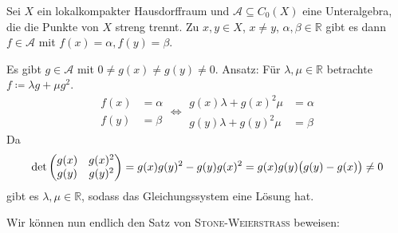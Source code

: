 \begin{lemma}[{name=[Eigenschaft einer streng trennenden Unteralgebra]},label=lem:unteralg-streng-trennend]
	Sei $X$ ein lokalkompakter Hausdorffraum und $\mathcal{A} \subseteq C_0(X)$ eine Unteralgebra, die die Punkte von $X$ streng trennt. 
	Zu $x,y \in X$, $x \neq y$, $\alpha, \beta \in \mathbb{R}$ gibt es dann $f \in \mathcal{A}$ mit $f(x) = \alpha, f(y) = \beta$.
\end{lemma}
\begin{beweis}
	Es gibt $g \in \mathcal{A}$ mit $0 \neq g(x) \neq g(y) \neq 0$. 
	Ansatz: Für $\lambda , \mu \in \mathbb{R}$ betrachte $f \coloneqq \lambda g + \mu g^2$.
	\[
		\begin{aligned}
			f(x) &{}= \alpha \\
			f(y) &{}= \beta
		\end{aligned} 
		\iff
		\begin{aligned}
			g(x) \lambda + g(x)^2 \mu &= \alpha \\
			g(y) \lambda + g(y)^2 \mu &= \beta
		\end{aligned} 
	\]
	Da 
	\[
		\det \begin{pmatrix}
			g(x)& g(x)^2 \\
			g(y) & g(y)^2
		\end{pmatrix} = g(x) g(y)^2 - g(y) g(x)^2 = g(x)g(y) \enbrace[\big]{g(y) - g(x)} \neq 0 
	\]
	gibt es $\lambda , \mu \in \mathbb{R}$, sodass das Gleichungssystem eine Lösung hat.
\end{beweis}

Wir können nun endlich den Satz von \textsc{Stone-Weierstraß} beweisen:

